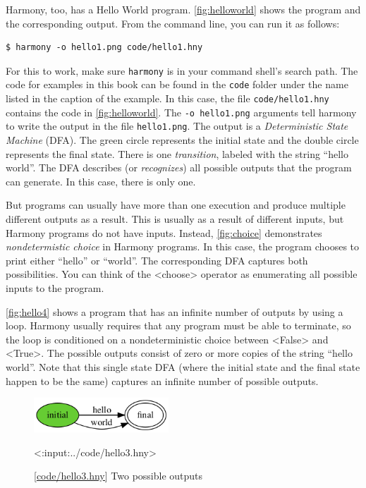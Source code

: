 \documentclass{report}
\newcommand{\harmonylink}[1]{%
[\href{https://harmony.cs.cornell.edu/#1}{\underline{#1}}]%
}
\newenvironment{code}{
\tcolorbox
}{
\endtcolorbox
}
\begin{document}
Harmony, too, has a Hello World program.
\autoref{fig:helloworld} shows the program and the corresponding output.
From the command line, you can run it as follows:
\begin{code}
\begin{verbatim}
$ harmony -o hello1.png code/hello1.hny
\end{verbatim}
\end{code}
For this to work, make sure \texttt{harmony} is in your command shell's
search path.
The code for examples in this book can be found in the \texttt{code}
folder under the name listed in the caption of the example.
In this case, the file \texttt{code/hello1.hny} contains the
code in \autoref{fig:helloworld}.
The \texttt{-o hello1.png} arguments tell harmony to write the output
in the file \texttt{hello1.png}.
The output is a \emph{Deterministic State Machine} (DFA).  The green circle
represents the initial state and the double circle represents the final
state.  There is one \emph{transition}, labeled with the string
``hello world''.  The DFA describes (or \emph{recognizes}) all possible
outputs that the program can generate.  In this case, there is only one.

%
But programs can usually have more than one execution and produce multiple
different outputs as a result.  This is usually as a result of different
inputs, but Harmony programs do not have inputs. Instead,
\autoref{fig:choice} demonstrates
\emph{nondetermistic choice} in Harmony programs.  In this case, the
program chooses to print either ``hello'' or ``world''.  The corresponding
DFA captures both possibilities.
You can think of the <{choose}> operator as enumerating all possible
inputs to the program.

\autoref{fig:hello4} shows a program that has an infinite number of outputs
by using a loop.  Harmony usually requires that any program must be able
to terminate, so the loop is conditioned on a nondeterministic choice between
<{False}> and <{True}>.  The possible outputs consist of zero or
more copies of the string ``hello world''.  Note that this single state DFA
(where the initial state and the final state happen to be the same)
captures an infinite number of possible outputs.

\begin{figure}
\begin{center}
\includegraphics[width=0.45\textwidth]{figures/hello3.png}
\end{center}
\begin{code}
<{:input:../code/hello3.hny}>
\end{code}
\caption{\harmonylink{code/hello3.hny} Two possible outputs}
\label{fig:choice}
\end{figure}
\end{document}
